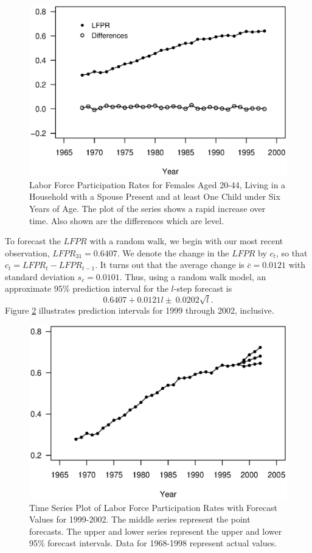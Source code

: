 \begin{figure}[htp]
  \begin{center}
      \includegraphics[width=.8\textwidth]{Chapter7Trend/LFPR.eps}
    \caption{\label{F7:LFPR} \small Labor Force Participation Rates for Females Aged 20-44,
    Living in a Household with a Spouse Present and at least One Child under Six Years of Age.
    The plot of the series shows a rapid increase over time. Also shown are the differences which are level.}
  \end{center}
\end{figure}

\bigskip

To forecast the $LFPR$ with a random walk, we begin with our most recent
observation, $LFPR_{31}=0.6407$. We denote the change in the $LFPR$ by $%
c_t $, so that $c_t=LFPR_t-LFPR_{t-1}$. It turns out that the
average change is $\overline{c}=0.0121$ with standard deviation
$s_c=0.0101$. Thus, using a random walk model, an approximate 95\%
prediction interval for
the $l$-step forecast is%
\begin{equation*}
0.6407+0.0121l\pm \ 0.0202\sqrt{l}.
\end{equation*}%
Figure \ref{F7:LFPRFore} illustrates prediction intervals for 1999
through 2002, inclusive.

\begin{figure}[htp]
  \begin{center}
   \includegraphics[width=.8\textwidth]{Chapter7Trend/LFPRFore.eps}
    \caption{\label{F7:LFPRFore} \small Time Series Plot of Labor Force Participation Rates
    with Forecast Values for 1999-2002. The middle series represent the point forecasts.
    The upper and lower series represent the upper and lower 95\% forecast intervals.
    Data for 1968-1998 represent actual values.}
  \end{center}
\end{figure}

